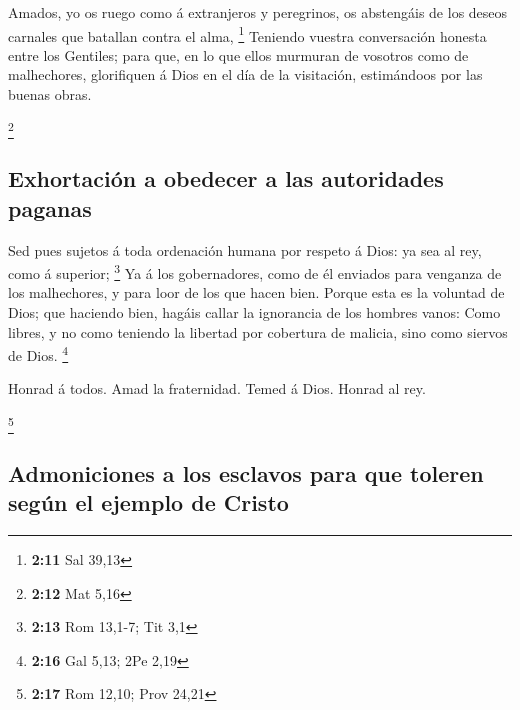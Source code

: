  Amados, yo os ruego como á extranjeros y peregrinos, os
abstengáis de los deseos carnales que batallan contra el alma,
\footnote{\textbf{2:11} Sal 39,13}  Teniendo vuestra
conversación honesta entre los Gentiles; para que, en lo que ellos
murmuran de vosotros como de malhechores, glorifiquen á Dios en el día
de la visitación, estimándoos por las buenas obras.

\footnote{\textbf{2:12} Mat 5,16}

\hypertarget{exhortaciuxf3n-a-obedecer-a-las-autoridades-paganas}{%
\subsection{Exhortación a obedecer a las autoridades
paganas}\label{exhortaciuxf3n-a-obedecer-a-las-autoridades-paganas}}

 Sed pues sujetos á toda ordenación humana por respeto á
Dios: ya sea al rey, como á superior; \footnote{\textbf{2:13} Rom
  13,1-7; Tit 3,1}  Ya á los gobernadores, como de él
enviados para venganza de los malhechores, y para loor de los que hacen
bien.  Porque esta es la voluntad de Dios; que haciendo
bien, hagáis callar la ignorancia de los hombres vanos: 
Como libres, y no como teniendo la libertad por cobertura de malicia,
sino como siervos de Dios. \footnote{\textbf{2:16} Gal 5,13; 2Pe 2,19}

 Honrad á todos. Amad la fraternidad. Temed á Dios. Honrad
al rey.

\footnote{\textbf{2:17} Rom 12,10; Prov 24,21}

\hypertarget{admoniciones-a-los-esclavos-para-que-toleren-seguxfan-el-ejemplo-de-cristo}{%
\subsection{Admoniciones a los esclavos para que toleren según el
ejemplo de
Cristo}\label{admoniciones-a-los-esclavos-para-que-toleren-seguxfan-el-ejemplo-de-cristo}}


